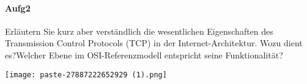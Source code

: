 \documentclass{article}
\begin{document}
\paragraph{Aufg2}
\begin{tcolorbox}[colback=white!10!white,colframe=lightgray!75!black,
  savelowerto=\jobname_ex.tex,breakable,enhanced,lines before break=40]

\justifying
Erläutern Sie kurz aber verständlich die wesentlichen Eigenschaften des Transmission Control Protocols (TCP) in der Internet-Architektur. Wozu dient es?Welcher Ebene im OSI-Referenzmodell entspricht seine Funktionalität?

\tcblower

\justifying
\begin{center}
\texttt{[image: paste-27887222652929 (1).png]}
\end{center}

\end{tcolorbox}
\end{document}
